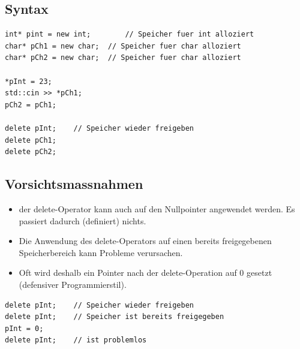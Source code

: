 \subsection{Syntax}
\noindent
\begin{minipage}{0.7\linewidth}
\begin{lstlisting}
int* pint = new int;		// Speicher fuer int alloziert
char* pCh1 = new char;	// Speicher fuer char alloziert
char* pCh2 = new char;	// Speicher fuer char alloziert

*pInt = 23;
std::cin >> *pCh1;
pCh2 = pCh1;

delete pInt;	// Speicher wieder freigeben
delete pCh1;
delete pCh2;
\end{lstlisting}
\end{minipage}%
\begin{minipage}{0.3\linewidth}
\vspace{\baselineskip}
\end{minipage}

\subsection{Vorsichtsmassnahmen}
\begin{itemize}
	\item der delete-Operator kann auch auf den Nullpointer angewendet werden. Es passiert dadurch (definiert) nichts.
	\item Die Anwendung des delete-Operators auf einen bereits freigegebenen Speicherbereich kann Probleme verursachen.
	\item Oft wird deshalb ein Pointer nach der delete-Operation auf 0 gesetzt (defensiver Programmierstil).
\end{itemize}
\noindent
\begin{minipage}{\linewidth}
\begin{lstlisting}
delete pInt;	// Speicher wieder freigeben
delete pInt;	// Speicher ist bereits freigegeben
pInt = 0;
delete pInt;	// ist problemlos
\end{lstlisting}
\end{minipage}

